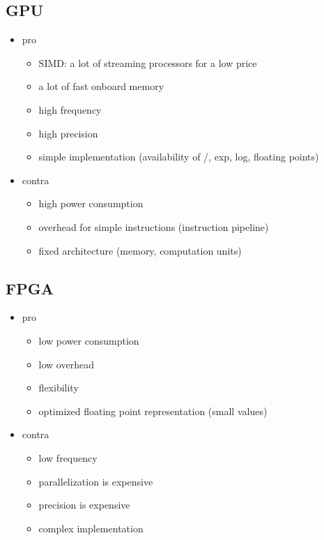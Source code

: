 \documentclass[mscthesis]{usiinfthesis}
\begin{document}
\subsection{GPU}
\begin{itemize}
    \item pro
    \begin{itemize}
        \item SIMD: a lot of streaming processors for a low price
        \item a lot of fast onboard memory
        \item high frequency
        \item high precision
        \item simple implementation (availability of /, exp, log,
            floating points)
    \end{itemize}
    \item contra
    \begin{itemize}
        \item high power consumption
        \item overhead for simple instructions (instruction pipeline)
        \item fixed architecture (memory, computation units)
    \end{itemize}
\end{itemize}

\subsection{FPGA}
\begin{itemize}
    \item pro
    \begin{itemize}
        \item low power consumption
        \item low overhead
        \item flexibility
        \item optimized floating point representation (small values)
    \end{itemize}
    \item contra
    \begin{itemize}
        \item low frequency
        \item parallelization is expensive
        \item precision is expensive
        \item complex implementation
    \end{itemize}
\end{itemize}
\end{document}
